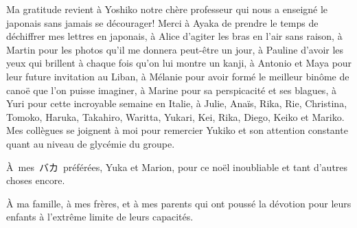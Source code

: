 Ma gratitude revient à Yoshiko notre chère professeur qui nous a
enseigné le japonais sans jamais se décourager! Merci à Ayaka de
prendre le temps de déchiffrer mes lettres en japonais, à Alice
d'agiter les bras en l'air sans raison, à Martin pour les photos qu'il
me donnera peut-être un jour, à Pauline d'avoir les yeux qui brillent
à chaque fois qu'on lui montre un kanji, à Antonio et Maya pour leur
future invitation au Liban, à Mélanie pour avoir formé le meilleur
binôme de canoë que l'on puisse imaginer, à Marine pour sa
perspicacité et ses blagues, à Yuri pour cette incroyable semaine en
Italie, à Julie, Anaïs, Rika, Rie, Christina, Tomoko, Haruka,
Takahiro, Waritta, Yukari, Kei, Rika, Diego, Keiko et Mariko. Mes collègues se
joignent à moi pour remercier Yukiko et son attention constante quant
au niveau de glycémie du groupe.


\begin{CJK*}{UTF8}{min}%
À~mes~バカ~préférées, Yuka et Marion, pour ce noël inoubliable et tant
d'autres choses encore.
\end{CJK*}



À ma famille, à mes frères, et à mes parents qui ont poussé la
dévotion pour leurs enfants à l'extrême limite de leurs capacités.
